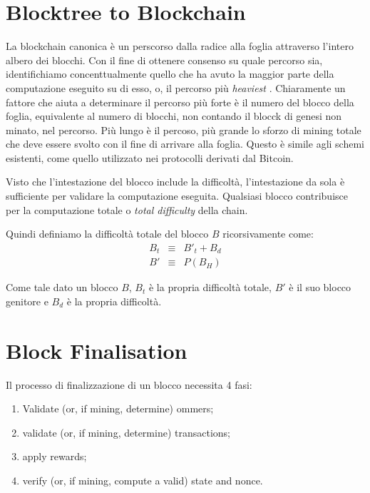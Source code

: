 \documentclass[9pt,oneside]{amsart}
\begin{document}
\begin{multicols}{2}
\section{Blocktree to Blockchain} \label{ch:ghost}

La blockchain canonica è un perscorso dalla radice alla foglia attraverso l'intero albero dei blocchi. Con il fine di ottenere consenso su quale percorso sia, identifichiamo concenttualmente quello che ha avuto la maggior parte della computazione eseguito su di esso, o, il percorso più \textit{heaviest} . Chiaramente un fattore che aiuta a determinare il percorso più forte è il numero del blocco della foglia, equivalente al numero di blocchi, non contando il blocck di genesi non minato, nel percorso. Più lungo è il percoso, più grande lo sforzo di mining totale che deve essere svolto con il fine di arrivare alla foglia. Questo è simile agli schemi esistenti, come quello utilizzato nei protocolli derivati dal Bitcoin.

Visto che l'intestazione del blocco include la difficoltà, l'intestazione da sola è sufficiente per validare la computazione eseguita. Qualsiasi blocco contribuisce per la computazione totale o \textit{total difficulty} della chain.

Quindi definiamo la difficoltà totale del blocco $B$ ricorsivamente come:
\begin{eqnarray}
B_t & \equiv & B'_t + B_d \\
B' & \equiv & P(B_H)
\end{eqnarray}

Come tale dato un blocco $B$, $B_t$ è la propria difficoltà totale, $B'$ è il suo blocco genitore e $B_d$ è la propria difficoltà.

\section{Block Finalisation} \label{ch:finalisation}

Il processo di finalizzazione di un blocco necessita 4 fasi:

\begin{enumerate}
\item Validate (or, if mining, determine) ommers;
\item validate (or, if mining, determine) transactions;
\item apply rewards;
\item verify (or, if mining, compute a valid) state and nonce.
\end{enumerate}


\end{multicols}
\end{document}
